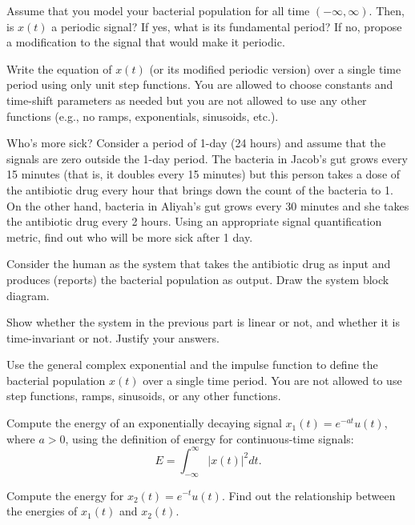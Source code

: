 \documentclass{ee102_pset}
\begin{document}
\problempart [10 points] Assume that you model your bacterial population for all time $(-\infty, \infty)$. Then, is $x(t)$ a periodic signal? If yes, what is its fundamental period? If no, propose a modification to the signal that would make it periodic.

\problempart [10 points] Write the equation of $x(t)$ (or its modified periodic version) over a single time period using only unit step functions. You are allowed to choose constants and time-shift parameters as needed but you are not allowed to use any other functions (e.g., no ramps, exponentials, sinusoids, etc.).


\problempart [15 points] Who's more sick? Consider a period of 1-day (24 hours) and assume that the signals are zero outside the 1-day period. The bacteria in Jacob's gut grows every 15 minutes (that is, it doubles every 15 minutes) but this person takes a dose of the antibiotic drug every hour that brings down the count of the bacteria to 1. On the other hand, bacteria in Aliyah's gut grows every 30 minutes and she takes the antibiotic drug every 2 hours. Using an appropriate signal quantification metric, find out who will be more sick after 1 day.

\problempart [5 points] Consider the human as the system that takes the antibiotic drug as input and produces (reports) the bacterial population as output. Draw the system block diagram.

\problempart [10 points] Show whether the system in the previous part is linear or not, and whether it is time-invariant or not. Justify your answers.

\problempart [10 points] Use the general complex exponential and the impulse function to define the bacterial population $x(t)$ over a single time period. You are not allowed to use step functions, ramps, sinusoids, or any other functions.

\problempart[5 points] Compute the energy of an exponentially decaying signal $x_1(t) = e^{-at}u(t)$, where $a>0$, using the definition of energy for continuous-time signals:
\[
E = \int_{-\infty}^{\infty} |x(t)|^2 dt.
\]

\problempart[10 points] Compute the energy for $x_2(t) = e^{-t}u(t)$. Find out the relationship between the energies of $x_1(t)$ and $x_2(t)$.
\end{document}

